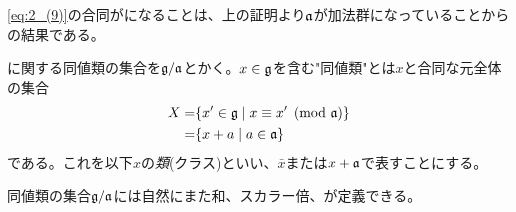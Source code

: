 \documentclass[fleqn,twocolumn,titlepage,dvipdfmx]{jsarticle}
\begin{document}
\begin{remark}
  \eqref{eq:2_(9)}の合同が{}になることは、上の証明より$\mathfrak{a}$が加法群になっていることからの結果である。
\end{remark}

\begin{definition}[類]\label{Def:class}
  {}に関する同値類の集合を$\mathfrak{g}/\mathfrak{a}$とかく。$x\in\mathfrak{g}$を含む"同値類"とは$x$と合同な元全体の集合
  \begin{align*}
    X=&\qty{x^{\prime}\in\mathfrak{g}\mid x\equiv x^{\prime} \pmod{\mathfrak{a}}} \\
    =& \qty{x+a\mid a\in\mathfrak{a}}
  \end{align*}
  である。これを以下$x$の\emph{類}(クラス)といい、$\bar{x}$または$x+\mathfrak{a}$で表すことにする。
\end{definition}


\begin{theorem}
  同値類の集合$\mathfrak{g}/\mathfrak{a}$には自然にまた和、スカラー倍、が定義できる。
\end{theorem}
\end{document}
